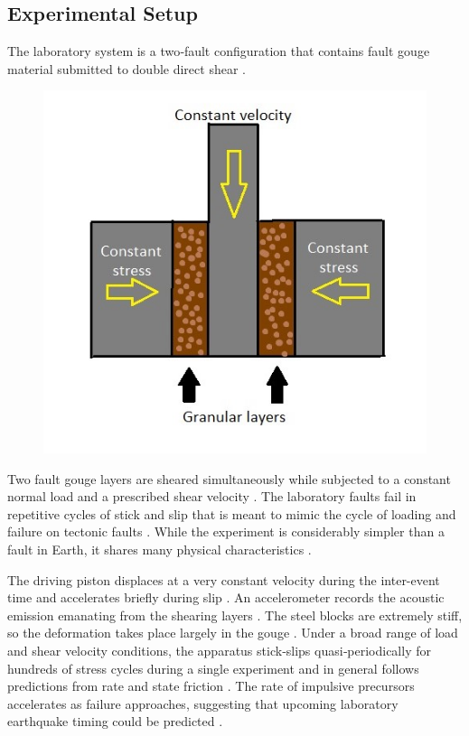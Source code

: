\documentclass[]{llncs} %
\begin{document}
\subsection{Experimental Setup}
The laboratory system is a two‐fault configuration that contains fault gouge material submitted to double direct shear \cite{kaggle}. \par
\begin{figure}[h]
	\centering
	\includegraphics[width=.9\linewidth]{lab}
	\caption{}
	\label{fig:lab}
\end{figure}
Two fault gouge layers are sheared simultaneously while subjected to a constant normal load and a prescribed shear velocity \cite{kaggle}. The laboratory faults fail in repetitive cycles of stick and slip that is meant to mimic the cycle of loading and failure on tectonic faults \cite{kaggle}. While the experiment is considerably simpler than a fault in Earth, it shares many physical characteristics \cite{kaggle}. \par

The driving piston displaces at a very constant velocity during the inter-event time and accelerates briefly during slip \cite{Bertrand}. An accelerometer records the acoustic emission emanating from the shearing layers \cite{Bertrand}. The steel blocks are extremely stiff, so the deformation takes place largely in the gouge \cite{Bertrand}. Under a broad range of load and shear velocity conditions, the apparatus stick‐slips quasi‐periodically for hundreds of stress cycles during a single experiment and in general follows predictions from rate and state friction \cite{Bertrand}. The rate of impulsive precursors accelerates as failure approaches, suggesting that upcoming laboratory earthquake timing could be predicted \cite{Bertrand}. \par
\end{document}
